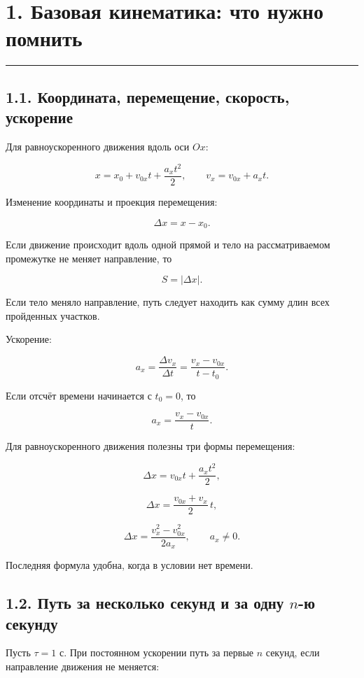 \documentclass[a4paper,12pt]{article}
\newcommand{\sectionline}{%
  \vspace{0.15em}%
  \noindent\textcolor{accent}{\rule{\linewidth}{0.6pt}}%
  \vspace{0.3em}%
}
\begin{document}

\section*{1. Базовая кинематика: что нужно помнить}
\sectionline

\subsection*{1.1. Координата, перемещение, скорость, ускорение}

Для равноускоренного движения вдоль оси $Ox$:

\[
x=x_0+v_{0x}t+\frac{a_xt^2}{2},
\qquad
v_x=v_{0x}+a_xt.
\]

Изменение координаты и проекция перемещения:

\[
\Delta x=x-x_0.
\]

Если движение происходит вдоль одной прямой и тело на рассматриваемом промежутке не меняет направление, то

\[
S=|\Delta x|.
\]

Если тело меняло направление, путь следует находить как сумму длин всех пройденных участков.

Ускорение:

\[
a_x=\frac{\Delta v_x}{\Delta t}
=\frac{v_x-v_{0x}}{t-t_0}.
\]

Если отсчёт времени начинается с $t_0=0$, то

\[
a_x=\frac{v_x-v_{0x}}{t}.
\]

Для равноускоренного движения полезны три формы перемещения:

\[
\boxed{\Delta x=v_{0x}t+\frac{a_xt^2}{2}},
\]

\[
\boxed{\Delta x=\frac{v_{0x}+v_x}{2}\,t},
\]

\[
\boxed{\Delta x=\frac{v_x^2-v_{0x}^2}{2a_x}},
\qquad a_x\ne0.
\]

Последняя формула удобна, когда в условии нет времени.

\subsection*{1.2. Путь за несколько секунд и за одну $n$-ю секунду}

Пусть $\tau=1\text{ с}$. При постоянном ускорении путь за первые $n$ секунд, если направление движения не меняется:
\end{document}
